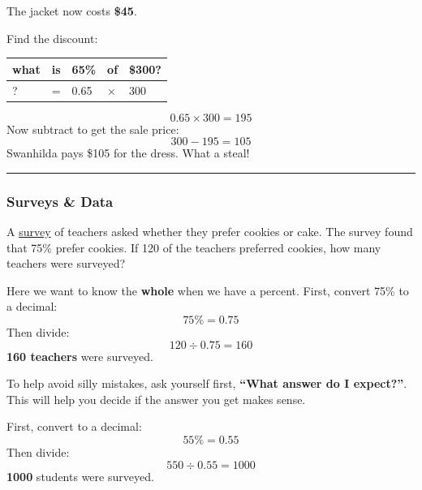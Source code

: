 \documentclass[
  letterpaper,
  DIV=11,
  numbers=noendperiod]{scrreprt}
\begin{document}
The jacket now costs \textbf{\$45}.

Find the discount:

\begin{longtable}[]{@{}lllll@{}}
\toprule\noalign{}
what & is & 65\% & of & \$300? \\
\midrule\noalign{}
\endhead
\bottomrule\noalign{}
\endlastfoot
? & = & 0.65 & × & 300 \\
\end{longtable}

\[
0.65 \times 300 = 195
\] Now subtract to get the sale price: \[
300 - 195 = 105
\] Swanhilda pays \$105 for the dress. What a steal!

\begin{center}\rule{0.5\linewidth}{0.5pt}\end{center}

\subsubsection*{Surveys \& Data}\label{surveys-data}

A \href{./glossary.html\#glossary-survey}{survey} of teachers asked
whether they prefer cookies or cake. The survey found that 75\% prefer
cookies. If 120 of the teachers preferred cookies, how many teachers
were surveyed?

Here we want to know the \textbf{whole} when we have a percent. First,
convert 75\% to a decimal: \[
75\% = 0.75
\] Then divide: \[
120 \div 0.75 = 160
\] \textbf{160 teachers} were surveyed.

\begin{tcolorbox}[enhanced jigsaw, left=2mm, opacityback=0, colback=white, rightrule=.15mm, toptitle=1mm, colframe=quarto-callout-tip-color-frame, leftrule=.75mm, toprule=.15mm, breakable, bottomtitle=1mm, bottomrule=.15mm, colbacktitle=quarto-callout-tip-color!10!white, arc=.35mm, opacitybacktitle=0.6, titlerule=0mm, coltitle=black, title=\textcolor{quarto-callout-tip-color}{\faLightbulb}\hspace{0.5em}{Tip}]

To help avoid silly mistakes, ask yourself first, \textbf{``What answer
do I expect?''}. This will help you decide if the answer you get makes
sense.

\end{tcolorbox}

First, convert to a decimal: \[
55\% = 0.55
\] Then divide: \[
550 \div 0.55 = 1000
\] \textbf{1000} students were surveyed.
\end{document}
